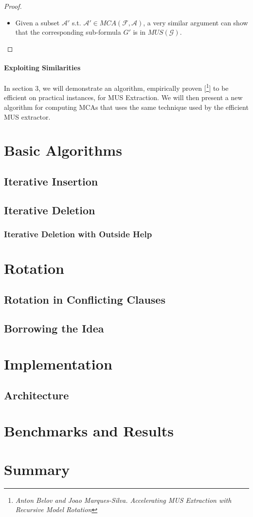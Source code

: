 \documentclass[]{article}
\begin{document}
\begin{proof}
\begin{itemize}
		\item Given a subset $ \mathcal{A}'$ s.t. $ \mathcal{A}' \in MCA(\mathcal{F,A}) $, a very similar argument can show that the corresponding sub-formula $ {G}' $ is in $ MUS(\mathcal{G})$.
	\end{itemize}
	\end{proof}

\paragraph{Exploiting Similarities} In section 3, we will demonstrate an algorithm, empirically proven [\footnote{\textit{Anton Belov and Joao Marques-Silva. Accelerating MUS Extraction with Recursive Model Rotation}}] to be efficient on practical instances, for MUS Extraction. We will then present a new algorithm for computing MCAs that uses the same technique used by the efficient MUS extractor.

	\section{Basic Algorithms}
	\subsection{Iterative Insertion}
	\subsection{Iterative Deletion}
	\subsubsection{Iterative Deletion with Outside Help}
	
	\section{Rotation}
	\subsection{Rotation in Conflicting Clauses}
	\subsection{Borrowing the Idea}
	
	\section{Implementation}
	\subsection{Architecture}
	
	\section{Benchmarks and Results}
	
	\section{Summary}
	
\end{document}
